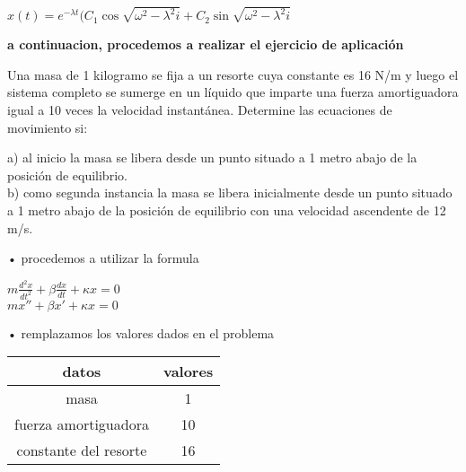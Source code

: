 \documentclass[12pt,a4paper]{article}
\begin{document}
 $x(t) = e^{-\lambda t}(C_{1}\cos\sqrt{\omega^{2}-\lambda^{2}i} + C_{2}\sin\sqrt{\omega^{2}-\lambda^{2}i}$
 
 \vspace{1cm}
 





\vspace{2cm}
\begin{flushleft}
\begin{center}

\begin{Large}
  \textbf{ a continuacion, procedemos a realizar el ejercicio de aplicación\\}
 \end{Large}
 \end{center}
 
 \vspace{1cm}
 
Una masa de 1 kilogramo se fija a un resorte cuya constante es 16 N/m y luego el sistema completo se sumerge
en un líquido que imparte una fuerza amortiguadora igual
a 10 veces la velocidad instantánea. Determine las ecuaciones de movimiento si:\\ 

\vspace{1cm}

a) al inicio la masa se libera desde un punto situado
a 1 metro abajo de la posición de equilibrio.\\
b) como segunda instancia la masa se libera inicialmente desde un punto situado a 1 metro abajo de la posición de equilibrio con una velocidad ascendente de 12 m/s.

\end{flushleft}

\vspace{0.6cm}

• procedemos a utilizar la formula 

\vspace{0.6cm}

$m{\frac{d^2x}{dt^2}} + \beta{\frac{dx}{dt} + \kappa x  =0} $\\

$mx'' + \beta x' + \kappa x = 0 $

\vspace{0.8cm}

•  remplazamos los valores dados en el problema

\vspace{0.6cm}

\begin{tabular}{|c|c|}\hline

\textbf{datos}     & \textbf{valores}\\ \hline

masa               &   1 \\ \hline

fuerza amortiguadora   &   10\\ \hline

constante del resorte &  16\\ \hline

\end{tabular}
\end{document}
